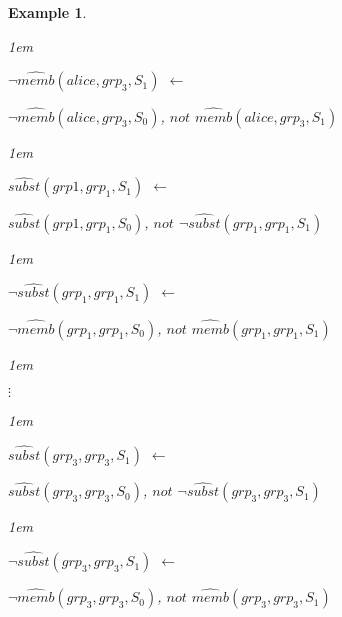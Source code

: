 \documentclass[11pt]{report}
\newtheorem{vexample}{Example}[chapter]
\newenvironment{vquote}
{
  \begin{list}{}{\leftmargin 1em}\item[]
}
{
  \end{list}
}
\begin{document}
\begin{vexample}
\begin{enumerate}
              \begin{vquote}
                $\lnot\hat{memb}(alice, grp_3, S_{1})$ $\leftarrow$

                \hspace{1em}
                $\lnot\hat{memb}(alice, grp_3, S_{0})$,
                $not$ $\hat{memb}(alice, grp_3, S_{1})$
              \end{vquote}

              \begin{vquote}
                $\hat{subst}(grp1, grp_1, S_{1})$ $\leftarrow$

                \hspace{1em}
                $\hat{subst}(grp1, grp_1, S_{0})$,
                $not$ $\lnot\hat{subst}(grp_1, grp_1, S_{1})$
              \end{vquote}

              \begin{vquote}
                $\lnot\hat{subst}(grp_1, grp_1, S_{1})$ $\leftarrow$

                \hspace{1em}
                $\lnot\hat{memb}(grp_1, grp_1, S_{0})$,
                $not$ $\hat{memb}(grp_1, grp_1, S_{1})$
              \end{vquote}

              \begin{vquote}
                \hspace{2em}$\vdots$
              \end{vquote}

              \begin{vquote}
                $\hat{subst}(grp_3, grp_3, S_{1})$ $\leftarrow$

                \hspace{1em}
                $\hat{subst}(grp_3, grp_3, S_{0})$,
                $not$ $\lnot\hat{subst}(grp_3, grp_3, S_{1})$
              \end{vquote}

              \begin{vquote}
                $\lnot\hat{subst}(grp_3, grp_3, S_{1})$ $\leftarrow$

                \hspace{1em}
                $\lnot\hat{memb}(grp_3, grp_3, S_{0})$,
                $not$ $\hat{memb}(grp_3, grp_3, S_{1})$
              \end{vquote}


\end{enumerate}
\end{vexample}
\end{document}
